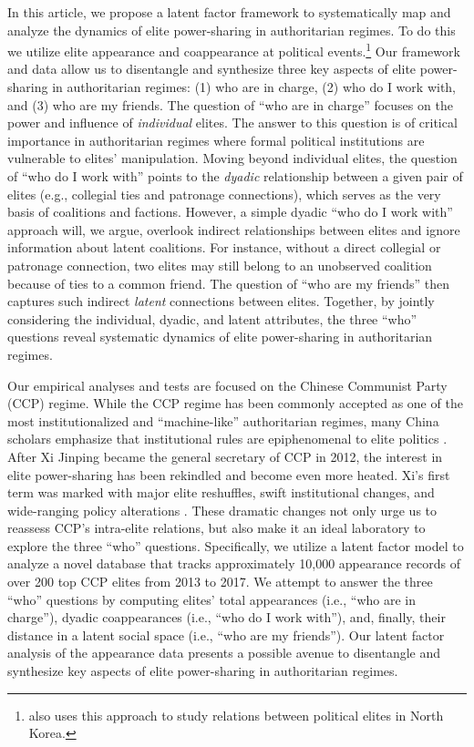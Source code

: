 \documentclass[11pt,english]{article}
\begin{document}
\begin{flushleft}
In this article, we propose a latent factor framework to systematically map and analyze the dynamics of elite power-sharing in authoritarian regimes. To do this we utilize elite appearance and coappearance at political events.\footnote{\citet{mahdavi_2019} also uses this approach to study relations between political elites in North Korea.} Our framework and data allow us to disentangle and synthesize three key aspects of elite power-sharing in authoritarian regimes: (1) who are in charge, (2) who do I work with, and (3) who are my friends. The question of ``who are in charge'' focuses on the power and influence of \emph{individual} elites. The answer to this question is of critical importance in authoritarian regimes where formal political institutions are vulnerable to elites' manipulation. Moving beyond individual elites, the question of ``who do I work with'' points to the \emph{dyadic} relationship between a given pair of elites (e.g., collegial ties and patronage connections), which serves as the very basis of coalitions and factions. However, a simple dyadic ``who do I work with'' approach will, we argue, overlook indirect relationships between elites and ignore information about latent coalitions. For instance, without a direct collegial or patronage connection, two elites may still belong to an unobserved coalition because of ties to a common friend. The question of ``who are my friends'' then captures such indirect \emph{latent} connections between elites. Together, by jointly considering the individual, dyadic, and latent attributes, the three ``who'' questions reveal systematic dynamics of elite power-sharing in authoritarian regimes.

Our empirical analyses and tests are focused on the Chinese Communist Party (CCP) regime. While the CCP regime has been commonly accepted as one of the most institutionalized and ``machine-like'' authoritarian regimes, many China scholars emphasize that institutional rules are epiphenomenal to elite politics \citep{Nathan1973,Tsou1976,Shih2010}. After Xi Jinping became the general secretary of CCP in 2012, the interest in elite power-sharing has been rekindled and become even more heated. Xi's first term was marked with major elite reshuffles, swift institutional changes, and wide-ranging policy alterations \citep{Miller2014b,Naughton2014,Lampton2015,Shirk2018}. These dramatic changes not only urge us to reassess CCP's intra-elite relations, but also make it an ideal laboratory to explore the three ``who'' questions. Specifically, we utilize a latent factor model \citep{hoff2018additive} to analyze a novel database that tracks approximately 10,000 appearance records of over 200 top CCP elites from 2013 to 2017. We attempt to answer the three ``who'' questions by computing elites' total appearances (i.e., ``who are in charge''), dyadic coappearances (i.e., ``who do I work with''), and, finally, their distance in a latent social space (i.e., ``who are my friends''). Our latent factor analysis of the appearance data presents a possible avenue to disentangle and synthesize key aspects of elite power-sharing in authoritarian regimes.


\end{flushleft}
\end{document}
